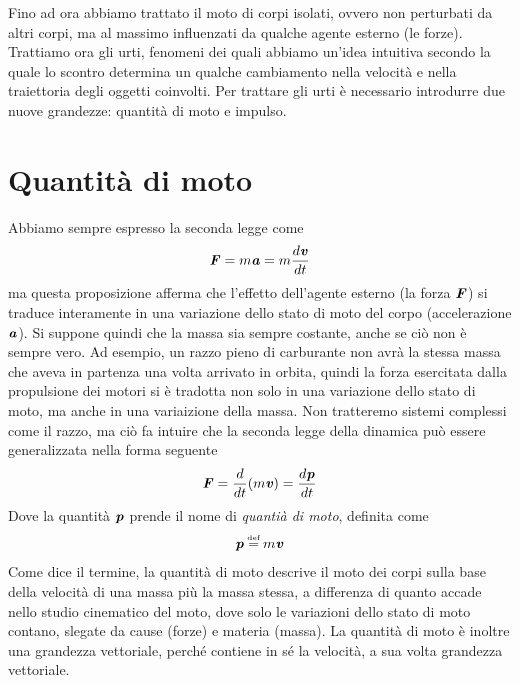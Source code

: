 \marginpar{\minitoc}

Fino ad ora abbiamo trattato il moto di corpi isolati, ovvero non
perturbati da altri corpi, ma al massimo influenzati da qualche agente
esterno (le forze). Trattiamo ora gli urti, fenomeni dei quali abbiamo
un'idea intuitiva secondo la quale lo scontro determina un qualche
cambiamento nella velocità e nella traiettoria degli oggetti coinvolti.
Per trattare gli urti è necessario introdurre due nuove grandezze:
quantità di moto e impulso.


\section{Quantità di moto}
Abbiamo sempre espresso la seconda legge come
\[ \textbf{\textit{F}} = m\textbf{\textit{a}} = m\frac{d\textbf{\textit{v}}}{dt} \]
ma questa proposizione afferma che l'effetto dell'agente esterno (la forza
$\textbf{\textit{F}}$) si traduce interamente in una variazione dello stato di
moto del corpo (accelerazione $\textbf{\textit{a}}$). Si suppone quindi che la
massa sia sempre costante, anche se ciò non è sempre vero. Ad esempio,
un razzo pieno di carburante non avrà la stessa massa che aveva in partenza
una volta arrivato in orbita, quindi la forza esercitata dalla propulsione
dei motori si è tradotta non solo in una variazione dello stato di moto,
ma anche in una variaizione della massa. Non tratteremo sistemi complessi
come il razzo, ma ciò fa intuire che la seconda legge della dinamica può
essere generalizzata nella forma seguente
\begin{align}
    \textbf{\textit{F}} = \frac{d}{dt}(m\textbf{\textit{v}}) = \frac{d\textbf{\textit{p}}}{dt}\label{qtamotosecondalegge}
\end{align}
Dove la quantità $\textbf{\textit{p}}$ prende il nome di \textit{quantià di moto},
definita come
\begin{align}
    \vecsymb{p} \eqdef m\vecsymb{v}
\end{align}
Come dice il termine, la quantità di moto descrive il moto dei corpi
sulla base della velocità di una massa più la massa stessa, a differenza
di quanto accade nello studio cinematico del moto, dove solo le variazioni
dello stato di moto contano, slegate da cause (forze) e materia (massa).
La quantità di moto è inoltre una grandezza vettoriale, perché contiene
in sé la velocità, a sua volta grandezza vettoriale.



